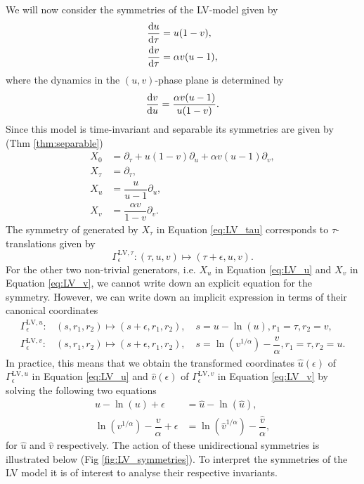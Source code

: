 We will now consider the symmetries of the LV-model \cite{lotka1920undamped,lotka1925elements,volterra1926variations} given by
\begin{equation}
  \begin{split}
    \dv{u}{\tau}&=u(1-v),\\
    \dv{v}{\tau}&=\alpha v(u-1),\\    
    \end{split}
  \label{eq:LV}
\end{equation}
where the dynamics in the $(u,v)$-phase plane is determined by
\begin{equation}
\dv{v}{u}=\dfrac{\alpha v(u-1)}{u(1-v)}.
  \label{eq:LV_phase_plane}
\end{equation}
Since this model is time-invariant and separable its symmetries are given by (Thm \ref{thm:separable})
\begin{align}
  X_0&=\partial_\tau+u(1-v)\partial_u+\alpha v(u-1)\partial_v,\label{eq:LV_0}\\
  X_\tau&=\partial_\tau,\label{eq:LV_tau}\\
  X_u&=\dfrac{u}{u-1}\partial_u,\label{eq:LV_u}\\
  X_v&=\dfrac{\alpha v}{1-v}\partial_v.\label{eq:LV_v}
\end{align}
The symmetry of generated by $X_\tau$ in Equation \eqref{eq:LV_tau} corresponds to $\tau$-translations given by
\begin{equation}
\Gamma^{\mathrm{LV},\tau}_{\epsilon}:(\tau,u,v)\mapsto (\tau+\epsilon,u,v).
\end{equation}
For the other two non-trivial generators, i.e. $X_u$ in Equation \eqref{eq:LV_u} and $X_v$ in Equation \eqref{eq:LV_v}, we cannot write down an explicit equation for the symmetry. However, we can write down an implicit expression in terms of their canonical coordinates
\begin{align}
\Gamma^{\mathrm{LV},u}_{\epsilon}:&(s,r_1,r_2)\mapsto(s+\epsilon,r_1,r_2),\quad s=u-\ln(u),r_1=\tau,r_2=v,\label{eq:LV_u}\\
\Gamma^{\mathrm{LV},v}_{\epsilon}:&(s,r_1,r_2)\mapsto(s+\epsilon,r_1,r_2),\quad s=\ln\left(v^{1/\alpha}\right)-\dfrac{v}{\alpha},r_1=\tau,r_2=u.\label{eq:LV_v}
\end{align}
In practice, this means that we obtain the transformed coordinates $\hat{u}(\epsilon)$ of $\Gamma^{\mathrm{LV},u}_{\epsilon}$ in Equation \eqref{eq:LV_u} and $\hat{v}(\epsilon)$ of $\Gamma^{\mathrm{LV},v}_{\epsilon}$ in Equation \eqref{eq:LV_v} by solving the following two equations
\begin{align}
u-\ln(u)+\epsilon&=\hat{u}-\ln(\hat{u}),\label{eq:LV_u_implicit}\\
\ln\left(v^{1/\alpha}\right)-\dfrac{v}{\alpha}+\epsilon&=\ln\left(\hat{v}^{1/\alpha}\right)-\dfrac{\hat{v}}{\alpha},\label{eq:LV_v_implicit}
\end{align}
for $\hat{u}$ and $\hat{v}$ respectively. The action of these unidirectional symmetries is illustrated below (Fig \ref{fig:LV_symmetries}). To interpret the symmetries of the LV model it is of interest to analyse their respective invariants.


